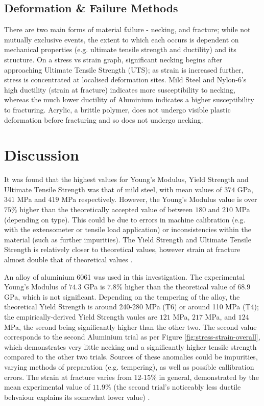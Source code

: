 \documentclass{article}
\begin{document}
\subsection{Deformation \& Failure Methods}
There are two main forms of material failure - necking, and fracture; while not mutually exclusive events, the extent to which each occurs is dependent on mechanical properties (e.g. ultimate tensile strength and ductility) and its structure. On a stress vs strain graph, significant necking begins after approaching Ultimate Tensile Strength (UTS); as strain is increased further, stress is concentrated at localised deformation sites.
Mild Steel and Nylon-6's high ductility (strain at fracture) indicates more susceptibility to necking, whereas the much lower ductility of Aluminium indicates a higher susceptibility to fracturing. Acrylic, a brittle polymer, does not undergo visible plastic deformation before fracturing and so does not undergo necking.

\section{Discussion}
It was found that the highest values for Young's Modulus, Yield Strength and Ultimate Tensile Strength was that of mild steel, with mean values of $374$ GPa, $341$ MPa and $419$ MPa respectively. However, the Young's Modulus value is over $75\%$ higher than the theoretically accepted value of between $180$ and $210$ MPa (depending on type). This could be due to errors in machine calibration (e.g. with the extensometer or tensile load application) or inconsistencies within the material (such as further impurities). The Yield Strength and Ultimate Tensile Strength is relatively closer to theoretical values, however strain at fracture almost double that of theoretical values \cite{MildSteel0} \cite{MildSteel1}.

An alloy of aluminium 6061 was used in this investigation. The experimental Young's Modulus of $74.3$ GPa is $7.8\%$ higher than the theoretical value of $68.9$ GPa, which is not significant. Depending on the tempering of the alloy, the theoretical Yield Strength is around 240-280 MPa (T6) or around 110 MPa (T4); the empirically-derived Yield Strength vaules are $121$ MPa, $217$ MPa, and $124$ MPa, the second being significantly higher than the other two. The second value corresponds to the second Aluminium trial as per Figure \ref{fig:stress-strain-overall}, which demonstrates very little necking and a significantly higher tensile strength compared to the other two trials. Sources of these anomalies could be impurities, varying methods of preparation (e.g. tempering), as well as possible callibration errors. The strain at fracture varies from 12-15\% in general, demonstrated by the mean experimental value of $11.9\%$ (the second trial's noticeably less ductile behvaiour explains its somewhat lower value) \cite{Aluminium0} \cite{Aluminium1}.
\end{document}
